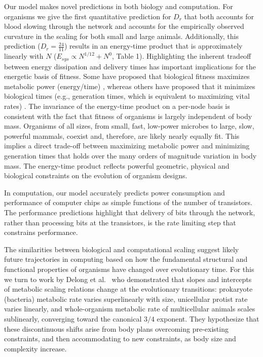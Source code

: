 \documentclass[12pt]{article}
\begin{document}
Our model makes novel predictions in both biology and computation. For organisms we give the first quantitative prediction for $D_r$ that both accounts for blood slowing through the network and accounts for the empirically observed curvature in the scaling for both small and large animals. Additionally, 
this prediction ($D_r = \frac{24}{11}$) results in an energy-time product that is approximately linearly with $N$ ($E_{sys} \propto N^{1/12} + N^0$, Table 1). Highlighting the inherent tradeoff between energy dissipation and delivery times 
has important implications for the energetic basis of fitness.  Some have proposed that biological fitness
maximizes metabolic power (energy/time) \cite{lotka56, odum71}, whereas others
have proposed that it minimizes biological times (e.g., generation times, which
is equivalent to maximizing vital rates) \cite{lindstedt81, sibly91}. The
invariance of the energy-time product on a per-node basis is consistent with the fact that fitness
of organisms is largely independent of body mass.  Organisms of all sizes, from
small, fast, low-power microbes to large, slow, powerful mammals, coexist and,
therefore, are likely nearly equally fit.  This implies a direct trade-off
between maximizing metabolic power and minimizing generation times that holds
over the many orders of magnitude variation in body mass.  The energy-time
product reflects powerful geometric, physical and biological constraints on the
evolution of organism designs.

In computation, our model accurately predicts power consumption and performance of computer chips as simple functions of the number of transistors. The performance predictions highlight that delivery of bits through the network, rather than processing bits at the transistors, is the rate limiting step that constrains performance. 

The similarities between biological and computational scaling
suggest likely future trajectories in computing based on how the fundamental structural and functional properties of organisms have changed over evolutionary time. For this we turn to work by Delong et al.~\cite{delong2010shifts} who
demonstrated that slopes and intercepts of metabolic scaling relations change at the
evolutionary transitions: prokaryote (bacteria) metabolic rate varies superlinearly with
size, unicellular protist rate varies linearly, and whole-organism metabolic rate of multicellular animals scales sublinearly, converging toward the canonical $3/4$ exponent. They
hypothesize that these discontinuous shifts arise from body plans overcoming pre-existing
constraints, and then accommodating to new constraints, as body size and complexity increase.
\end{document}
